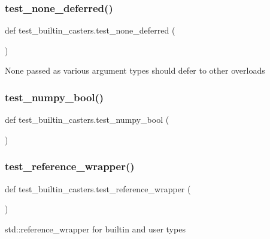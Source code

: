\subsubsection{\texorpdfstring{test\_none\_deferred()}{test\_none\_deferred()}}
{\footnotesize\ttfamily def test\+\_\+builtin\+\_\+casters.\+test\+\_\+none\+\_\+deferred (\begin{DoxyParamCaption}{ }\end{DoxyParamCaption})}

\begin{DoxyVerb}None passed as various argument types should defer to other overloads\end{DoxyVerb}
 \mbox{\label{namespacetest__builtin__casters_a2d4819565c8160faefda505355e3dc28}} 
\subsubsection{\texorpdfstring{test\_numpy\_bool()}{test\_numpy\_bool()}}
{\footnotesize\ttfamily def test\+\_\+builtin\+\_\+casters.\+test\+\_\+numpy\+\_\+bool (\begin{DoxyParamCaption}{ }\end{DoxyParamCaption})}

\mbox{\label{namespacetest__builtin__casters_ab4739375a69546aec3a73882e721e49f}} 
\subsubsection{\texorpdfstring{test\_reference\_wrapper()}{test\_reference\_wrapper()}}
{\footnotesize\ttfamily def test\+\_\+builtin\+\_\+casters.\+test\+\_\+reference\+\_\+wrapper (\begin{DoxyParamCaption}{ }\end{DoxyParamCaption})}

\begin{DoxyVerb}std::reference_wrapper for builtin and user types\end{DoxyVerb}
 \mbox{\label{namespacetest__builtin__casters_a5bb94d5c10c4c6b222555d7c70525ba9}} 
